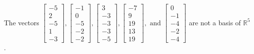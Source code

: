 \begin{exercise}
\begin{exerciseStatement}
  \end{exerciseStatement}
  \begin{exerciseAnswer}
   The vectors \(\left[\begin{array}{r}
-5 \\
2 \\
-5 \\
1 \\
-3
\end{array}\right] , \left[\begin{array}{r}
-1 \\
0 \\
-5 \\
-2 \\
-2
\end{array}\right] , \left[\begin{array}{r}
3 \\
-3 \\
-3 \\
-3 \\
-5
\end{array}\right] , \left[\begin{array}{r}
-7 \\
9 \\
19 \\
13 \\
19
\end{array}\right] , \text{ and } \left[\begin{array}{r}
0 \\
-1 \\
-4 \\
-2 \\
-4
\end{array}\right]\) 
  	 are not  a basis of \(\mathbb{R}^5\).
  


  \end{exerciseAnswer}
\end{exercise}
